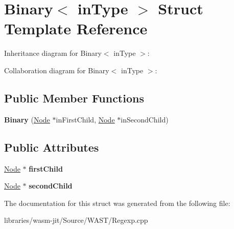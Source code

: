 \hypertarget{struct_binary}{}\section{Binary$<$ in\+Type $>$ Struct Template Reference}
\label{struct_binary}


Inheritance diagram for Binary$<$ in\+Type $>$\+:


Collaboration diagram for Binary$<$ in\+Type $>$\+:
\subsection*{Public Member Functions}
\begin{DoxyCompactItemize}
\item 
\mbox{\label{struct_binary_a981a42c63999a8d399a6616a93d4e645}} 
{\bfseries Binary} (\mbox{\hyperlink{struct_node}{Node}} $\ast$in\+First\+Child, \mbox{\hyperlink{struct_node}{Node}} $\ast$in\+Second\+Child)
\end{DoxyCompactItemize}
\subsection*{Public Attributes}
\begin{DoxyCompactItemize}
\item 
\mbox{\label{struct_binary_a07baa7a3980615b418daf277f2869532}} 
\mbox{\hyperlink{struct_node}{Node}} $\ast$ {\bfseries first\+Child}
\item 
\mbox{\label{struct_binary_a64ad28d31d54ee6f87c054f68e571134}} 
\mbox{\hyperlink{struct_node}{Node}} $\ast$ {\bfseries second\+Child}
\end{DoxyCompactItemize}


The documentation for this struct was generated from the following file\+:\begin{DoxyCompactItemize}
\item 
libraries/wasm-\/jit/\+Source/\+W\+A\+S\+T/Regexp.\+cpp\end{DoxyCompactItemize}
